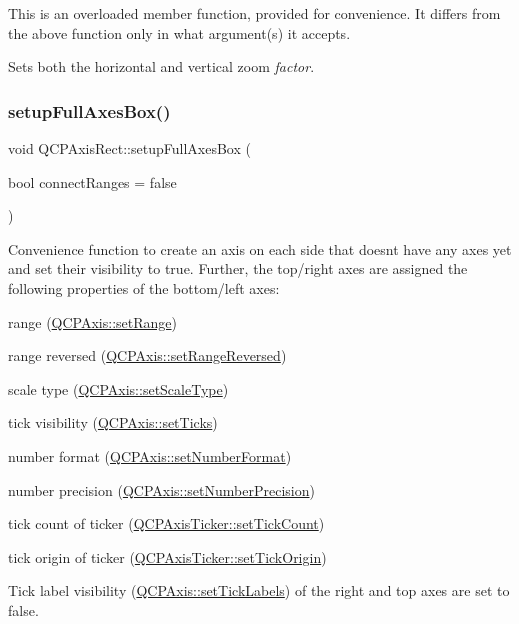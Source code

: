 This is an overloaded member function, provided for convenience. It differs from the above function only in what argument(s) it accepts.

Sets both the horizontal and vertical zoom {\itshape factor}. \mbox{\label{class_q_c_p_axis_rect_a5fa906175447b14206954f77fc7f1ef4}} 
\subsubsection{\texorpdfstring{setupFullAxesBox()}{setupFullAxesBox()}}
{\footnotesize\ttfamily void Q\+C\+P\+Axis\+Rect\+::setup\+Full\+Axes\+Box (\begin{DoxyParamCaption}\item[{bool}]{connect\+Ranges = {\ttfamily false} }\end{DoxyParamCaption})}

Convenience function to create an axis on each side that doesn\textquotesingle{}t have any axes yet and set their visibility to true. Further, the top/right axes are assigned the following properties of the bottom/left axes\+:

\begin{DoxyItemize}
\item range (\mbox{\hyperlink{class_q_c_p_axis_aebdfea5d44c3a0ad2b4700cd4d25b641}{Q\+C\+P\+Axis\+::set\+Range}}) \item range reversed (\mbox{\hyperlink{class_q_c_p_axis_a2172fdb196b1a0dc3f40992fcad8e9e1}{Q\+C\+P\+Axis\+::set\+Range\+Reversed}}) \item scale type (\mbox{\hyperlink{class_q_c_p_axis_adef29cae617af4f519f6c40d1a866ca6}{Q\+C\+P\+Axis\+::set\+Scale\+Type}}) \item tick visibility (\mbox{\hyperlink{class_q_c_p_axis_ac891409315bc379e3b1abdb162c1a011}{Q\+C\+P\+Axis\+::set\+Ticks}}) \item number format (\mbox{\hyperlink{class_q_c_p_axis_ae585a54dc2aac662e90a2ca82f002590}{Q\+C\+P\+Axis\+::set\+Number\+Format}}) \item number precision (\mbox{\hyperlink{class_q_c_p_axis_a21dc8023ad7500382ad9574b48137e63}{Q\+C\+P\+Axis\+::set\+Number\+Precision}}) \item tick count of ticker (\mbox{\hyperlink{class_q_c_p_axis_ticker_a47752abba8293e6dc18491501ae34008}{Q\+C\+P\+Axis\+Ticker\+::set\+Tick\+Count}}) \item tick origin of ticker (\mbox{\hyperlink{class_q_c_p_axis_ticker_ab509c7e500293bf66a8409f0d7c23943}{Q\+C\+P\+Axis\+Ticker\+::set\+Tick\+Origin}})\end{DoxyItemize}
Tick label visibility (\mbox{\hyperlink{class_q_c_p_axis_a04ba16e1f6f78d70f938519576ed32c8}{Q\+C\+P\+Axis\+::set\+Tick\+Labels}}) of the right and top axes are set to false.

